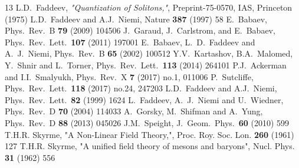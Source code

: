 \documentclass[12pt,a4paper]{article}
\begin{document}
\begin{small}
\begin{thebibliography}{13}
L.D.~Faddeev, {\it{"Quantization of Solitons,"}},
Preprint-75-0570, IAS, Princeton (1975)
L.D.~Faddeev and A.J.~Niemi, Nature {\bf 387} (1997) 58
E.~Babaev, Phys.\ Rev.\ B {\bf 79} (2009) 104506
J.~Garaud, J.~Carlstrom, and E.~Babaev, Phys.\ Rev.\ Lett.\ {\bf 107} (2011) 197001
E.~Babaev, L.~D.~Faddeev and A.~J.~Niemi, Phys.\ Rev.\ B {\bf 65} (2002) 100512
Y.V.~Kartashov, B.A.~Malomed, Y.~Shnir and L.~Torner, Phys.\ Rev.\ Lett.\  {\bf 113} (2014) 264101
P.J.~Ackerman and I.I.~Smalyukh,  Phys.\ Rev.\ X {\bf 7} (2017) no.1,  011006
P.~Sutcliffe,
  Phys.\ Rev.\ Lett.\  {\bf 118} (2017) no.24,  247203
L.D.~Faddeev and A.J.~Niemi, Phys.\ Rev.\ Lett.\  {\bf 82} (1999) 1624
L.~Faddeev, A.~J.~Niemi and U.~Wiedner, Phys.\ Rev.\ D {\bf 70} (2004) 114033
A.~Gorsky, M.~Shifman and A.~Yung, Phys.\ Rev.\ D {\bf 88} (2013) 045026
J.M.~Speight, J.\ Geom.\ Phys.\  {\bf 60} (2010) 599
 T.H.R. Skyrme,
"A Non-Linear Field Theory,",
Proc. Roy. Soc. Lon. {\bf 260} (1961) 127
 T.H.R. Skyrme,
"A unified field theory of mesons and baryons", Nucl. Phys. {\bf 31} (1962) 556

\end{thebibliography}
\end{small}
\end{document}
